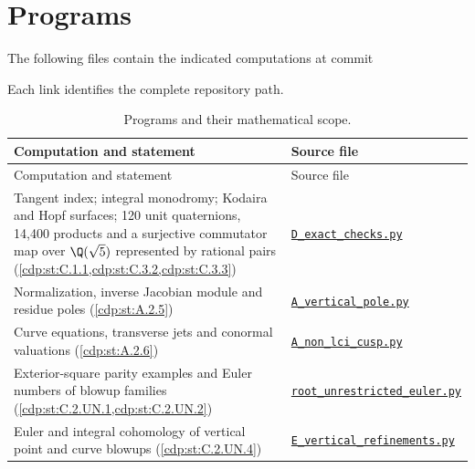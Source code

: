 \section*{Programs}
The following files contain the indicated computations at commit
\begin{center}\small\ttfamily\SsixRepositoryCommit\end{center}
Each link identifies the complete repository path.

{\footnotesize
\renewcommand{\arraystretch}{.9}
\setlength{\tabcolsep}{4pt}
\begin{longtable}{@{}>{\raggedright\arraybackslash}p{}>{\raggedright\arraybackslash}p{}@{}}
\caption{Programs and their mathematical scope.}\label{tab:II:programs}\\
\toprule Computation and statement & Source file \\
\midrule\endfirsthead
\toprule Computation and statement & Source file \\
\midrule\endhead
\bottomrule\endfoot
Tangent index; integral monodromy; Kodaira and Hopf surfaces; 120 unit quaternions, 14,400 products and a surjective commutator map over $\Q(\sqrt5)$ represented by rational pairs (\cref{cdp:st:C.1.1,cdp:st:C.3.2,cdp:st:C.3.3}) & \href{https://raw.githubusercontent.com/KokunoYumeto/s6-complex-structure-workbench/\SsixRepositoryCommit/pro_returns/S6_03_CDP_checkpoint_13_20261116T0136Z/S6_03_CDP/code/D_exact_checks.py}{\nolinkurl{D_exact_checks.py}} \\[3pt]
Normalization, inverse Jacobian module and residue poles (\cref{cdp:st:A.2.5}) & \href{https://raw.githubusercontent.com/KokunoYumeto/s6-complex-structure-workbench/\SsixRepositoryCommit/pro_returns/S6_03_CDP_checkpoint_13_20261116T0136Z/S6_03_CDP/code/A_vertical_pole.py}{\nolinkurl{A_vertical_pole.py}} \\[3pt]
Curve equations, transverse jets and conormal valuations (\cref{cdp:st:A.2.6}) & \href{https://raw.githubusercontent.com/KokunoYumeto/s6-complex-structure-workbench/\SsixRepositoryCommit/pro_returns/S6_03_CDP_checkpoint_13_20261116T0136Z/S6_03_CDP/code/A_non_lci_cusp.py}{\nolinkurl{A_non_lci_cusp.py}} \\[3pt]
Exterior-square parity examples and Euler numbers of blowup families (\cref{cdp:st:C.2.UN.1,cdp:st:C.2.UN.2}) & \href{https://raw.githubusercontent.com/KokunoYumeto/s6-complex-structure-workbench/\SsixRepositoryCommit/pro_returns/S6_03_CDP_checkpoint_13_20261116T0136Z/S6_03_CDP/code/root_unrestricted_euler.py}{\nolinkurl{root_unrestricted_euler.py}} \\[3pt]
Euler and integral cohomology of vertical point and curve blowups (\cref{cdp:st:C.2.UN.4}) & \href{https://raw.githubusercontent.com/KokunoYumeto/s6-complex-structure-workbench/\SsixRepositoryCommit/pro_returns/S6_03_CDP_checkpoint_13_20261116T0136Z/S6_03_CDP/code/E_vertical_refinements.py}{\nolinkurl{E_vertical_refinements.py}} \\[3pt]
\end{longtable}}

